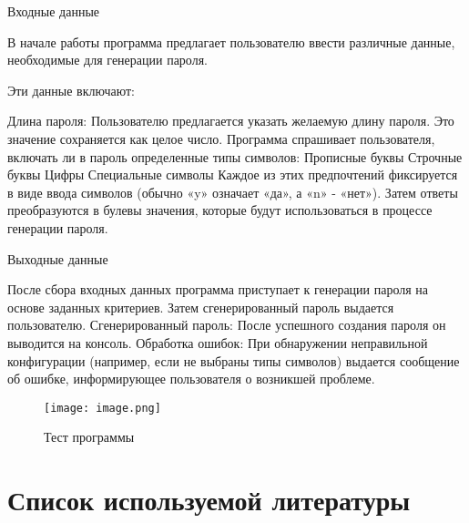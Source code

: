 \documentclass[14pt,a4paper]{scrartcl}
\begin{document}
Входные данные


В начале работы программа предлагает пользователю ввести различные данные, необходимые для генерации пароля.

Эти данные включают:

Длина пароля: Пользователю предлагается указать желаемую длину пароля. Это значение сохраняется как целое число.
Программа спрашивает пользователя, включать ли в пароль определенные типы символов:
Прописные буквы
Строчные буквы
Цифры
Специальные символы
Каждое из этих предпочтений фиксируется в виде ввода символов (обычно «y» означает «да», а «n» - «нет»). Затем ответы преобразуются в булевы значения, которые будут использоваться в процессе генерации пароля.


Выходные данные


После сбора входных данных программа приступает к генерации пароля на основе заданных критериев. Затем сгенерированный пароль выдается пользователю.
Сгенерированный пароль: После успешного создания пароля он выводится на консоль.
Обработка ошибок: При обнаружении неправильной конфигурации (например, если не выбраны типы символов) выдается сообщение об ошибке, информирующее пользователя о возникшей проблеме.

\begin{figure}
    \centering
    \texttt{[image: image.png]}
    \caption{Тест программы}
    \label{fig:enter-label}
\end{figure}
\newpage
\section{Список используемой литературы}
\end{document}
